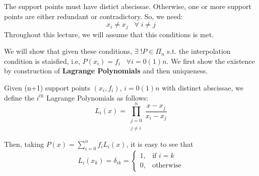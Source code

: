 \begin{rmark}
    The support points must have distict abscissae. Otherwise, one or more support points are either redundant or contradictory. So, we need:
    $$x_i \neq x_j \;\;\;\forall\;i\neq j$$
    Throughout this lecture, we will assume that this conditions is met.
\end{rmark}

We will show that given these conditions, $\exists\;! P \in \Pi_n$ s.t. the interpolation condition is staisfied, i.e, $P(x_i) = f_i\;\;\;\forall i=0(1)n$. We first show the existence by construction of \textbf{Lagrange Polynomials} and then uniqueness.\\

\begin{defn}
    Given (n+1) support points $(x_i,f_i)$, $i = 0(1)n$ with distinct abscissae, we define the $i^{th}$ Lagrange Polynomials as follows:
    $$L_i(x) = \prod^n_{\substack{ j = 0\\j \neq i}} \frac{x - x_j}{x_i - x_j}$$
\end{defn}


Then, taking $P(x) =  \sum_{i=0}^{n} f_i L_i(x)$, it is easy to see that
$$L_i(x_k) = \delta_{ik} = 
   \begin{cases}
        1, & \text{if }i=k \\
        0, & \text{otherwise}
   \end{cases}
$$

